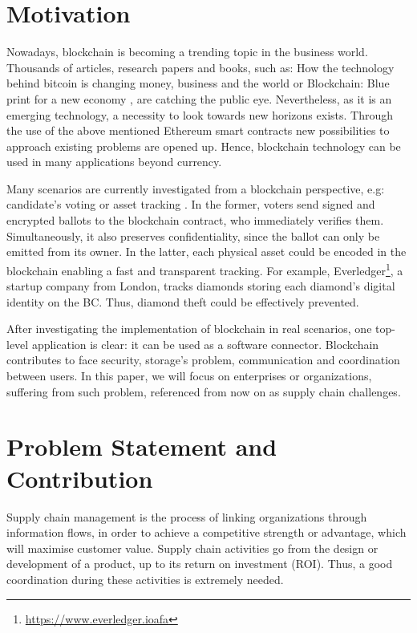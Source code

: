 \section{Motivation}

Nowadays, blockchain is becoming a trending topic in the business world. Thousands of articles, research papers and books, such as: How the technology behind bitcoin is changing money, business and the world \cite{tapscott2016blockchain} or Blockchain: Blue print for a new economy \cite{swan2015blockchain}, are catching the public eye. Nevertheless, as it is an emerging technology, a necessity to look towards new horizons exists. Through the use of the above mentioned Ethereum smart contracts new possibilities to approach existing problems are opened up. Hence, blockchain technology can be used in many applications beyond currency.

Many scenarios are currently investigated from a blockchain perspective, e.g: candidate's voting or asset tracking \cite{abeyratne2016blockchain}. In the former, voters send signed and encrypted ballots to the blockchain contract, who immediately verifies them. Simultaneously, it also preserves confidentiality, since the ballot can only be emitted from its owner. In the latter, each physical asset could be encoded in the blockchain enabling a fast and transparent tracking. For example, Everledger\footnote{\url{https://www.everledger.ioafa}}, a startup company from London, tracks diamonds storing each diamond's digital identity on the BC. Thus, diamond theft could be effectively prevented.

After investigating the implementation of blockchain in real scenarios, one top-level application is clear: it can be used as a software connector. Blockchain contributes to face security, storage's problem, communication and coordination between users. In this paper, we will focus on enterprises or organizations, suffering from such problem, referenced from now on as supply chain challenges.

\section{Problem Statement and Contribution}

Supply chain management is the process of linking organizations through information flows, in order to achieve a competitive strength or advantage, which will maximise customer value. Supply chain activities go from the design or development of a product, up to its return on investment (ROI). Thus, a good coordination during these activities is extremely needed.

